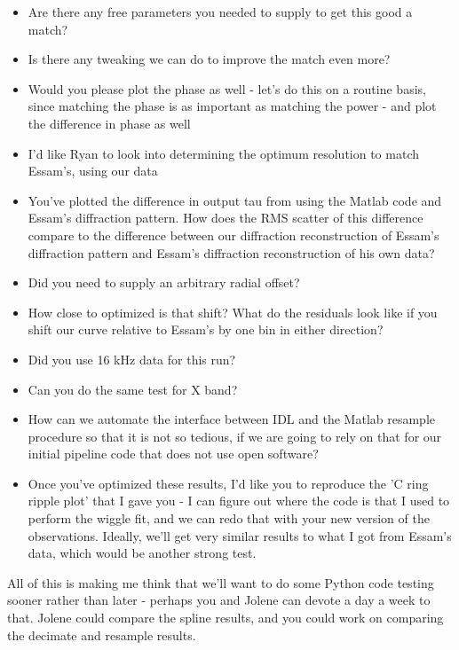 \documentclass[crop=false,class=article,oneside]{standalone}
\begin{document}
\begin{itemize}
    \item Are there any free parameters you needed to supply to get this good a match?
    \item Is there any tweaking we can do to improve the match even more?
    \item Would you please plot the phase as well - let's do this on a routine basis, since matching the phase is as important as matching the power - and plot the difference in phase as well
    \item I'd like Ryan to look into determining the optimum resolution to match Essam's, using our data
    \item You've plotted the difference in output tau from using the Matlab code and Essam's diffraction pattern. How does the RMS scatter of this difference compare to the difference between our diffraction reconstruction of Essam's diffraction pattern and Essam's diffraction reconstruction of his own data?
    \item Did you need to supply an arbitrary radial offset? 
    \item How close to optimized is that shift? What do the residuals look like if you shift our curve relative to Essam's by one bin in either direction?
    \item Did you use 16 kHz data for this run?
    \item Can you do the same test for X band?
    \item How can we automate the interface between IDL and the Matlab resample procedure so that it is not so tedious, if we are going to rely on that for our initial pipeline code that does not use open software?
    \item Once you've optimized these results, I'd like you to reproduce the 'C ring ripple plot' that I gave you - I can figure out where the code is that I used to perform the wiggle fit, and we can redo that with your new version of the observations. Ideally, we'll get very similar results to what I got from Essam's data, which would be another strong test.
\end{itemize}
All of this is making me think that we'll want to do some Python code testing sooner rather than later - perhaps you and Jolene can devote a day a week to that.  Jolene could compare the spline results, and you could work on comparing the decimate and resample results.
\end{document}
